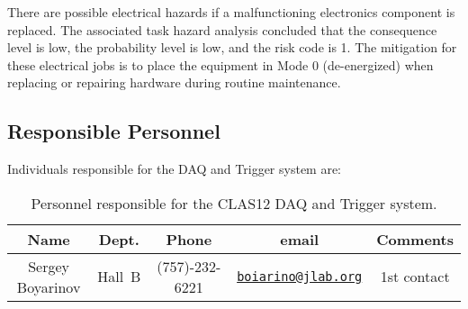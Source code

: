 There are possible electrical hazards if a malfunctioning electronics component is replaced. 
The associated task hazard analysis concluded that the consequence level is low, the 
probability level is low, and the risk code is 1. The mitigation for these electrical jobs is 
to place the equipment in Mode 0 (de-energized) when replacing or repairing hardware during 
routine maintenance.

\subsection{Responsible Personnel}

Individuals responsible for the DAQ and Trigger system are:

\begin{table}[!htb]
\centering
\begin{tabular}{|c|c|c|c|c|} \hline
Name&Dept.&Phone&email&Comments \\ \hline
Sergey Boyarinov&Hall~B&(757)-232-6221&\href{mailto:boiarino@jlab.org}{\nolinkurl{boiarino@jlab.org}}&1st contact \\ \hline
 \end{tabular}
\caption{Personnel responsible for the CLAS12 DAQ and Trigger system.} 
\label{tb:daq}
\end{table}

